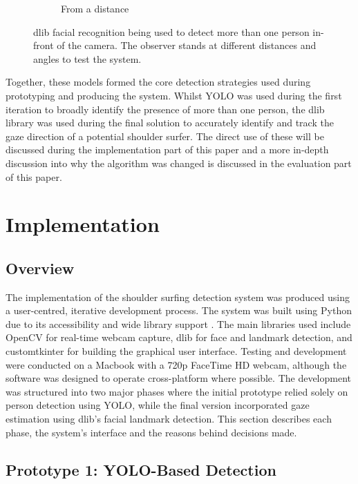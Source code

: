 \documentclass[12pt]{article}
\theoremstyle{plain}
\theoremstyle{definition}
\begin{document}
\begin{figure}[h!]
\begin{subfigure}[b]{0.3\textwidth}
         \caption{From a distance}
         \label{fig:face_c}
     \end{subfigure}
        \caption{dlib facial recognition being used to detect more than one person in-front of the camera. The observer stands at different distances and angles to test the system.}
        \label{fig:dlib}
\end{figure}

Together, these models formed the core detection strategies used during prototyping and producing the system. Whilst YOLO was used during the first iteration to broadly identify the presence of more than one person, the dlib library was used during the final solution to accurately identify and track the gaze direction of a potential shoulder surfer. The direct use of these will be discussed during the implementation part of this paper and a more in-depth discussion into why the algorithm was changed is discussed in the evaluation part of this paper.

\section{Implementation}
\label{implementation}

\subsection{Overview}
\label{imp_overview}

The implementation of the shoulder surfing detection system was produced using a user-centred, iterative development process. The system was built using Python due to its accessibility and wide library support \cite{chen_study_2017}. The main libraries used include OpenCV \cite{culjak_brief_2012} for real-time webcam capture, dlib \cite{noauthor_dlib_nodate} for face and landmark detection, and customtkinter for building the graphical user interface. Testing and development were conducted on a Macbook with a 720p FaceTime HD webcam, although the software was designed to operate cross-platform where possible.
The development was structured into two major phases where the initial prototype relied solely on person detection using YOLO, while the final version incorporated gaze estimation using dlib’s facial landmark detection. This section describes each phase, the system’s interface and the reasons behind decisions made.

\subsection{Prototype 1: YOLO-Based Detection}
\label{prototype_1}
\end{document}
